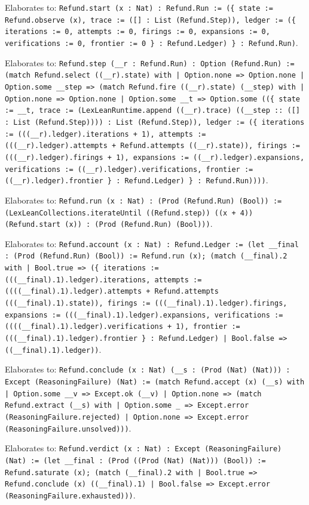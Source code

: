 \documentclass[11pt]{article}
\begin{document}
\noindent Elaborates to: \texttt{Refund.start (x : Nat) : Refund.Run := (\{ state := Refund.observe (x), trace := ([] : List (Refund.Step)), ledger := (\{ iterations := 0, attempts := 0, firings := 0, expansions := 0, verifications := 0, frontier := 0 \} : Refund.Ledger) \} : Refund.Run)}.\par
\noindent Elaborates to: \texttt{Refund.step (\_\_r : Refund.Run) : Option (Refund.Run) := (match Refund.select ((\_\_r).state) with | Option.none => Option.none | Option.some \_\_step => (match Refund.fire ((\_\_r).state) (\_\_step) with | Option.none => Option.none | Option.some \_\_t => Option.some ((\{ state := \_\_t, trace := (LexLeanRuntime.append ((\_\_r).trace) ((\_\_step :: ([] : List (Refund.Step)))) : List (Refund.Step)), ledger := (\{ iterations := (((\_\_r).ledger).iterations + 1), attempts := (((\_\_r).ledger).attempts + Refund.attempts ((\_\_r).state)), firings := (((\_\_r).ledger).firings + 1), expansions := ((\_\_r).ledger).expansions, verifications := ((\_\_r).ledger).verifications, frontier := ((\_\_r).ledger).frontier \} : Refund.Ledger) \} : Refund.Run))))}.\par
\noindent Elaborates to: \texttt{Refund.run (x : Nat) : (Prod (Refund.Run) (Bool)) := (LexLeanCollections.iterateUntil ((Refund.step)) ((x + 4)) (Refund.start (x)) : (Prod (Refund.Run) (Bool)))}.\par
\noindent Elaborates to: \texttt{Refund.account (x : Nat) : Refund.Ledger := (let \_\_final : (Prod (Refund.Run) (Bool)) := Refund.run (x); (match (\_\_final).2 with | Bool.true => (\{ iterations := (((\_\_final).1).ledger).iterations, attempts := ((((\_\_final).1).ledger).attempts + Refund.attempts (((\_\_final).1).state)), firings := (((\_\_final).1).ledger).firings, expansions := (((\_\_final).1).ledger).expansions, verifications := ((((\_\_final).1).ledger).verifications + 1), frontier := (((\_\_final).1).ledger).frontier \} : Refund.Ledger) | Bool.false => ((\_\_final).1).ledger))}.\par
\noindent Elaborates to: \texttt{Refund.conclude (x : Nat) (\_\_s : (Prod (Nat) (Nat))) : Except (ReasoningFailure) (Nat) := (match Refund.accept (x) (\_\_s) with | Option.some \_\_v => Except.ok (\_\_v) | Option.none => (match Refund.extract (\_\_s) with | Option.some \_ => Except.error (ReasoningFailure.rejected) | Option.none => Except.error (ReasoningFailure.unsolved)))}.\par
\noindent Elaborates to: \texttt{Refund.verdict (x : Nat) : Except (ReasoningFailure) (Nat) := (let \_\_final : (Prod ((Prod (Nat) (Nat))) (Bool)) := Refund.saturate (x); (match (\_\_final).2 with | Bool.true => Refund.conclude (x) ((\_\_final).1) | Bool.false => Except.error (ReasoningFailure.exhausted)))}.\par
\end{document}
